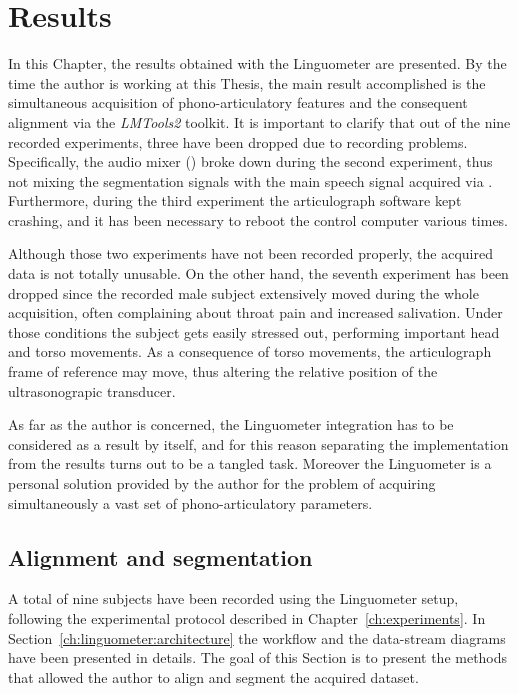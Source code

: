 \chapter{Results}
\label{ch:results}
In this Chapter, the results obtained with the Linguometer are presented.
By the time the author is working at this Thesis, the main result accomplished
is the simultaneous acquisition of phono-articulatory features and the
consequent alignment via the \emph{LMTools2} toolkit.
It is important to clarify that out of the nine recorded experiments, three 
have been dropped due to recording problems.
Specifically, the audio mixer () broke down during the second
experiment, thus not mixing the segmentation signals with the main speech 
signal acquired via .
Furthermore, during the third experiment the articulograph software kept 
crashing, and it has been necessary to reboot the control computer various
times.

Although those two experiments have not been recorded properly, the acquired 
data is not totally unusable.
On the other hand, the seventh experiment has been dropped since the recorded 
male subject extensively moved during the whole acquisition, often complaining
about throat pain and increased salivation.
Under those conditions the subject gets easily stressed out, performing
important head and torso movements.
As a consequence of torso movements, the articulograph frame of reference may
move, thus altering the relative position of the ultrasonograpic transducer.

As far as the author is concerned, the Linguometer integration has to be 
considered as a result by itself, and for this reason separating the
implementation from the results turns out to be a tangled task.
Moreover
the Linguometer is a personal solution provided by the author for the
problem of acquiring simultaneously a vast set of phono-articulatory
parameters.

\section{Alignment and segmentation}
A total of nine subjects have been recorded using the Linguometer setup,
following the experimental protocol described in Chapter~\ref{ch:experiments}.
In Section~\ref{ch:linguometer:architecture} the workflow and the data-stream
diagrams have been presented in details.
The goal of this Section is to present the methods that allowed the author to
align and segment the acquired dataset.

